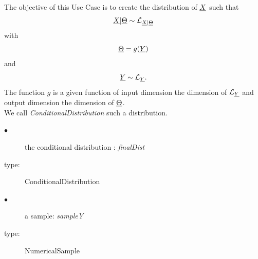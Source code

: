 \renewcommand{\filename}{docUC_InputBayesian_CondDist.tex}
\renewcommand{\filetitle}{UC : Creation of a  distribution with uncertain parameters}

\HeaderIIILevel




The objective of this Use Case is to create  the distribution of ${\underline{X}}$ such that $${\underline{X}}|{\underline{\Theta}} \sim {\mathcal L}_{{\underline{X}}|{\underline{\Theta}}}$$ with $${\underline{\Theta}}=g({\underline{Y}})$$ and $${\underline{Y}} \sim {\mathcal L}_{{\underline{Y}}}.$$ The function $g$ is a given function of input dimension the dimension of ${\mathcal L}_{{\underline{Y}}}$ and output dimension the dimension of ${\underline{\Theta}}$.\\
We call {\itshape ConditionalDistribution} such a distribution.\\


{
  \begin{description}
  \item[$\bullet$] the conditional distribution : {\itshape  finalDist}
  \item[type:]  ConditionalDistribution
  \item[$\bullet$] a sample: {\itshape sampleY}
  \item[type:]  NumericalSample
  \end{description}
}

